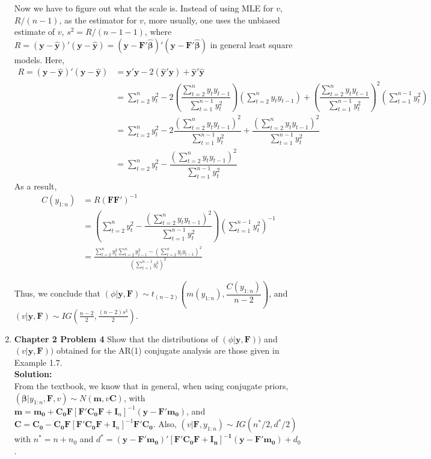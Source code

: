 \documentclass[12pt]{article}\usepackage[]{graphicx}\usepackage[]{color}
\newcommand{\bsbeta}{\boldsymbol{\beta}}
\newcommand{\bfy}{\mathbf{y}}
\newcommand{\bfF}{\mathbf{F}}
\begin{document}
\begin{enumerate}
	Now we have to figure out what the scale is. Instead of using MLE for $v$, $R/(n-1)$, as the estimator for $v$, more usually, one uses the unbiased estimate of $v$, $s^2 = R/(n-1-1)$, where $R = (\mathbf{y - \hat{y}})'(\mathbf{y - \hat{y}}) =  (\mathbf{y - F'\boldsymbol{\hat{\beta}}})'(\mathbf{y - F'\boldsymbol{\hat{\beta}}})$ in general least square models. Here,
	\begin{align*}
		R = (\mathbf{y - \hat{y}})'(\mathbf{y - \hat{y}}) &= \mathbf{y'y} - 2\mathbf{(\hat{y}'y)} + \mathbf{\hat{y}'\hat{y}} \\
		&= \sum_{t = 2}^n y_t^2 - 2\left(\dfrac{ \sum_{t=2}^n y_t y_{t-1}}{\sum_{t = 1}^{n-1} y_t^2} \right) \left( \sum_{t = 2}^n y_t y_{t-1}\right ) + \left( \dfrac{ \sum_{t=2}^n y_t y_{t-1}}{\sum_{t = 1}^{n-1} y_t ^2} \right)^2 \left( \sum_{t = 1}^{n-1} y_t^2 \right)\\
		&= \sum_{t = 2}^n y_t^2  - 2\dfrac{\left( \sum_{t=2}^n y_t y_{t-1} \right)^2}{\sum_{t = 1}^{n-1} y_t^2} + \dfrac{\left( \sum_{t=2}^n y_t y_{t-1} \right)^2}{\sum_{t = 1}^{n-1} y_t^2} \\
		&= \sum_{t = 2}^n y_t^2  - \dfrac{\left( \sum_{t=2}^n y_t y_{t-1} \right)^2}{\sum_{t = 1}^{n-1} y_t^2}
	\end{align*}
	As a result, 
	\begin{align*}
		C(y_{1:n}) &= R(\mathbf{FF'})^{-1}\\
		&=\left(\sum_{t = 2}^n y_t^2  - \dfrac{\left( \sum_{t=2}^n y_t y_{t-1} \right)^2}{\sum_{t = 1}^{n-1} y_t^2} \right) \left( \sum_{t = 1}^{n-1} y_t^2\right)^{-1}\\
		&= \frac{\sum_{t = 2}^n y_t^2 \sum_{t = 2}^n y_{t-1}^2 - \left( \sum_{t=2}^n y_t y_{t-1} \right)^2}{ \left( \sum_{t = 1}^{n-1} y_t^2\right)^2}
	\end{align*}
	
	Thus, we conclude that $(\phi|\bfy, \bfF) \sim t_{(n-2)} \left( m(y_{1:n}), \dfrac{C(y_{1:n})}{n-2}\right)$, and $(v|\mathbf{y, F}) \sim IG\left( \frac{n-2}{2}, \frac{(n-2)s^2}{2} \right)$.


	\item \textbf{Chapter 2 Problem 4} Show that the distributions of $(\phi|\bfy, \bfF))$ and $(v|\bfy, \bfF))$ obtained for the AR(1) conjugate analysis are those given in Example 1.7.\\
	\textbf{Solution:}\\
	From the textbook, we know that in general, when using conjugate priors, $(\bsbeta|y_{1:n}, \bfF, v) \sim N(\mathbf{m}, v\mathbf{C})$, with $\mathbf{m} = \mathbf{m_0} + \mathbf{C_0F}[\mathbf{F'C_0F}+\mathbf{I}_n]^{-1}(\mathbf{y-F'm_0})$, and $\mathbf{C=C_0}-\mathbf{C_0F}[\mathbf{F'C_0F}+\mathbf{I}_n]^{-1}\mathbf{F'C_0}$. Also, $(v|\bfF, y_{1:n}) \sim IG(n^*/2, d^*/2)$ with $n^* = n + n_0$ and $d^*=\mathbf{(y-F'm_0)'[\mathbf{F'C_0F}+\mathbf{I}_{n}]^{-1}(y-F'm_0)} + d_0$.


\end{enumerate}
\end{document}
